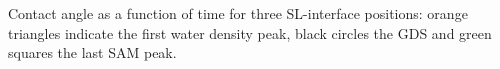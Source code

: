\label{fig:equil_c_angle} \label{fig:C_Angle_time}Contact angle as a function of time for
three SL-interface positions: orange triangles indicate the first
water density peak, black circles the GDS and green squares the last
SAM peak. 